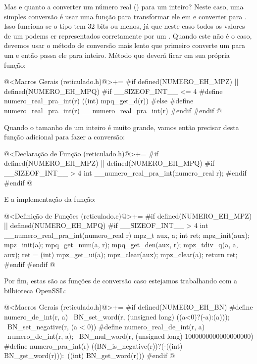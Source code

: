 Mas e quanto a converter um número real () para um
inteiro? Neste caso, uma simples conversão é usar uma função para
transformar ele em  e converter
para . Isso funciona se o tipo  tem 32
bits ou menos, já que neste caso todos os valores de
um  podems er representados corretamente por
um . Quando este não é o caso, devemos usar o
método de conversão mais lento que primeiro converte
um  para um  e então passa ele
para inteiro. Método que deverá ficar em sua própria função:

\iniciocodigo
@<Macros Gerais (reticulado.h)@>+=
#if defined(NUMERO_EH_MPZ) || defined(NUMERO_EH_MPQ)
#if __SIZEOF_INT__ <= 4
#define numero_real_pra_int(r) ((int) mpq_get_d(r))
#else
#define numero_real_pra_int(r) __numero_real_pra_int(r)
#endif
#endif
@
\fimcodigo

Quando o tamanho de um inteiro é muito grande, vamos então precisar
desta função adicional para fazer a conversão:

\iniciocodigo
@<Declaração de Função (reticulado.h)@>+=
#if defined(NUMERO_EH_MPZ) || defined(NUMERO_EH_MPQ)
#if __SIZEOF_INT__ > 4
int __numero_real_pra_int(numero_real r);
#endif
#endif
@
\fimcodigo

E a implementação da função:

\iniciocodigo
@<Definição de Funções (reticulado.c)@>+=
#if defined(NUMERO_EH_MPZ) || defined(NUMERO_EH_MPQ)
#if __SIZEOF_INT__ > 4
int __numero_real_pra_int(numero_real r){
  mpz_t aux, a;
  int ret;
  mpz_init(aux);
  mpz_init(a);
  mpq_get_num(a, r);
  mpq_get_den(aux, r);
  mpz_tdiv_q(a, a, aux);
  ret = (int) mpz_get_ui(a);
  mpz_clear(aux);
  mpz_clear(a);
  return ret;
}
#endif
#endif
@
\fimcodigo

Por fim, estas são as funções de conversão caso estejamos trabalhando
com a bilbioteca OpenSSL:

\iniciocodigo
@<Macros Gerais (reticulado.h)@>+=
#if defined(NUMERO_EH_BN)
#define numero_de_int(r, a)                                     \
          BN_set_word(r, (unsigned long) ((a<0)?(-a):(a)));    \
          BN_set_negative(r, (a < 0))
#define numero_real_de_int(r, a)   \
          numero_de_int(r, a);  \
          BN_mul_word(r, (unsigned long) 1000000000000000000)
#define numero_pra_int(r) ((BN_is_negative(r))?(-((int) BN_get_word(r))):\
                                              ((int) BN_get_word(r)))
#endif
@
\fimcodigo

